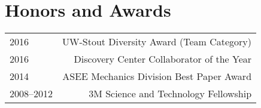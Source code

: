\section*{Honors and Awards}
\begin{tabular}{L!{\VRule}R}
2016&UW-Stout Diversity Award (Team Category)\\
2016&Discovery Center Collaborator of the Year\\
2014&ASEE Mechanics Division Best Paper Award\\
2008--2012&3M Science and Technology Fellowship\\
\end{tabular}